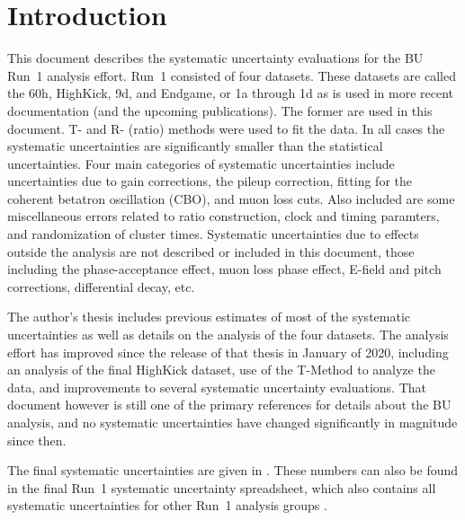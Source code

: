 
\graphicspath{}

\section{Introduction}


This document describes the systematic uncertainty evaluations for the BU Run~1 \wa analysis effort. Run~1 consisted of four datasets. These datasets are called the 60h, HighKick, 9d, and Endgame, or 1a through 1d as is used in more recent documentation (and the upcoming publications). The former are used in this document. T- and R- (ratio) methods were used to fit the data. In all cases the systematic uncertainties are significantly smaller than the statistical uncertainties. Four main categories of systematic uncertainties include uncertainties due to gain corrections, the pileup correction, fitting for the coherent betatron oscillation (CBO), and muon loss cuts. Also included are some miscellaneous errors related to ratio construction, clock and timing paramters, and randomization of cluster times. Systematic uncertainties due to effects outside the \wa analysis are not described or included in this document, those including the phase-acceptance effect, muon loss phase effect, E-field and pitch corrections, differential decay, etc.

The author's thesis \cite{phdthesis:2020Kinnaird} includes previous estimates of most of the systematic uncertainties as well as details on the analysis of the four datasets. The analysis effort has improved since the release of that thesis in January of 2020, including an analysis of the final HighKick dataset, use of the T-Method to analyze the data, and improvements to several systematic uncertainty evaluations. That document however is still one of the primary references for details about the BU \wa analysis, and no systematic uncertainties have changed significantly in magnitude since then.

The final systematic uncertainties are given in . These numbers can also be found in the final Run~1 systematic uncertainty spreadsheet, which also contains all systematic uncertainties for other Run~1 analysis groups \cite{UncertaintySpreadsheet}.







